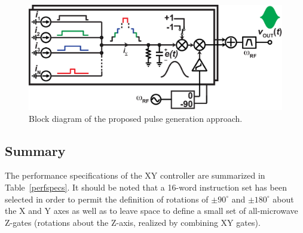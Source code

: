 \documentclass[journal]{IEEEtran}
\newcommand{\CR}[1]{{\color{black}#1}}
\newcommand{\CG}[1]{{\color{green}#1}}
\begin{document}
\begin{figure}[bt!]
\begin{center}
\includegraphics[width=\columnwidth]{Figures/FIGURE_7}
\end{center}
\caption{Block diagram of the proposed pulse generation approach.}
\label{Concept}
\end{figure}






\subsection{Summary}
The performance specifications of the XY controller are summarized in Table~\ref{perfspecs}. \CR{It should be noted that a 16-word instruction set has been selected in order to permit the definition of rotations of $\pm{}90^\circ$ and $\pm{}180^\circ$ about the X and Y \CG{axes} as well as to leave space to define a small set of all-microwave Z-gates (rotations about the Z-axis, realized by combining XY gates)}. 

\end{document}
